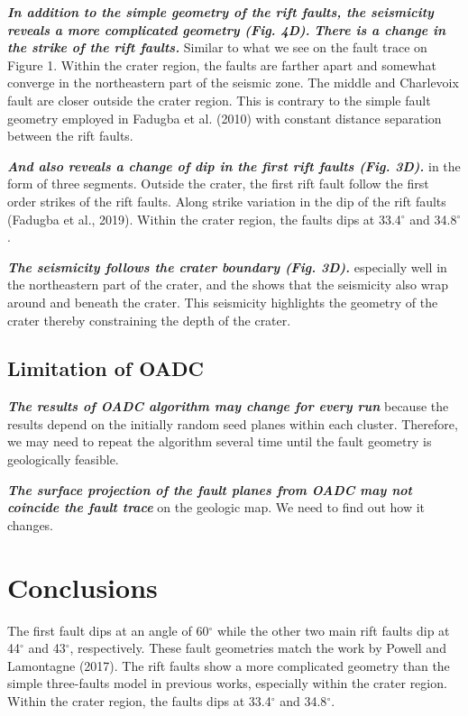 \documentclass[draft]{agujournal2018}
\begin{document}
\textit{\textbf{In addition to the simple geometry of the rift faults, the seismicity reveals a more complicated geometry (Fig. 4D).}} \textit{\textbf{There is a change in the strike of the rift faults.}} Similar to what we see on the fault trace on Figure 1. Within the crater region, the faults are farther apart and somewhat converge in the northeastern part of the seismic zone. The middle and Charlevoix fault are closer outside the crater region. This is contrary to the simple fault geometry employed in Fadugba et al. (2010) with constant distance separation between the rift faults.

\textit{\textbf{And also reveals a change of dip in the first rift faults (Fig. 3D).}} in the form of three segments. Outside the crater, the first rift fault follow the first order strikes of the rift faults. Along strike variation in the dip of the rift faults (Fadugba et al., 2019). Within the crater region, the faults dips at 33.4$^\circ$ and 34.8$^\circ$.

\textit{\textbf{The seismicity follows the crater boundary (Fig. 3D).}} especially well in the northeastern part of the crater, and the shows that the seismicity also wrap around and beneath the crater. This seismicity highlights the geometry of the crater thereby constraining the depth of the crater. 


\subsection{Limitation of OADC}
\textit{\textbf{The results of OADC algorithm may change for every run}} because the results depend on the initially random seed planes within each cluster. Therefore, we may need to repeat the algorithm several time until the fault geometry is geologically feasible. 

\textit{\textbf{The surface projection of the fault planes from OADC may not coincide the fault trace}} on the geologic map. We need to find out how it changes.



\section{Conclusions}
The first fault dips at an angle of 60$^\circ$ while the other two main rift faults dip at 44$^\circ$ and 43$^\circ$, respectively. These fault geometries match the work by Powell and Lamontagne (2017). The rift faults show a more complicated geometry than the simple three-faults model in previous works, especially within the crater region. Within the crater region, the faults dips at 33.4$^\circ$ and 34.8$^\circ$. 
\end{document}
